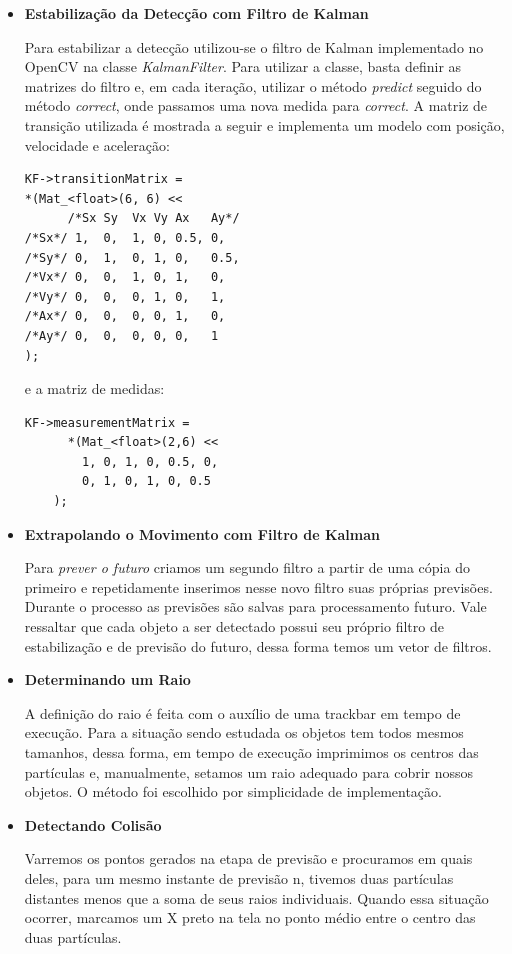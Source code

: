 \documentclass[journal]{IEEEtran}
\begin{document}
\begin{itemize}
\item \textbf{Estabilização da Detecção com Filtro de Kalman}

Para estabilizar a detecção utilizou-se o filtro de Kalman 
implementado no OpenCV na classe \textit{KalmanFilter}. Para utilizar
a classe, basta definir as matrizes do filtro e, em cada iteração, 
utilizar o método \textit{predict} seguido do método 
\textit{correct}, onde passamos uma nova medida para \textit{correct}.
A matriz de transição utilizada é mostrada a seguir e implementa um 
modelo com posição, velocidade e aceleração:

\begin{lstlisting}
KF->transitionMatrix =
*(Mat_<float>(6, 6) <<
      /*Sx Sy  Vx Vy Ax   Ay*/
/*Sx*/ 1,  0,  1, 0, 0.5, 0, 
/*Sy*/ 0,  1,  0, 1, 0,   0.5,
/*Vx*/ 0,  0,  1, 0, 1,   0,
/*Vy*/ 0,  0,  0, 1, 0,   1,
/*Ax*/ 0,  0,  0, 0, 1,   0,
/*Ay*/ 0,  0,  0, 0, 0,   1
);
\end{lstlisting}

e a matriz de medidas:

\begin{lstlisting}
KF->measurementMatrix =
      *(Mat_<float>(2,6) <<
	    1, 0, 1, 0, 0.5, 0,
	    0, 1, 0, 1, 0, 0.5
	);
\end{lstlisting}

\item \textbf{Extrapolando o Movimento com Filtro de Kalman}

Para \textit{prever o futuro} criamos um segundo filtro a partir
de uma cópia do primeiro e repetidamente inserimos nesse novo filtro
suas próprias previsões. Durante o processo as previsões são salvas 
para processamento futuro. Vale ressaltar que cada objeto a ser 
detectado possui seu próprio filtro de estabilização e de previsão do 
futuro, dessa forma temos um vetor de filtros.

\item \textbf{Determinando um Raio}

A definição do 
raio é feita com o auxílio de uma trackbar em tempo de execução.
Para a situação sendo estudada os objetos tem todos mesmos tamanhos, 
dessa forma, em tempo de execução imprimimos os centros das partículas
e, manualmente, setamos um raio adequado para cobrir nossos objetos.
O método foi escolhido por simplicidade de implementação.

\item \textbf{Detectando Colisão}

Varremos os pontos gerados na etapa de previsão e procuramos em quais 
deles, para um mesmo instante de previsão n, tivemos duas partículas
distantes menos que a soma de seus raios individuais. Quando essa
situação ocorrer, marcamos um X preto na tela no ponto médio entre o
centro das duas partículas.


\end{itemize}
\end{document}
